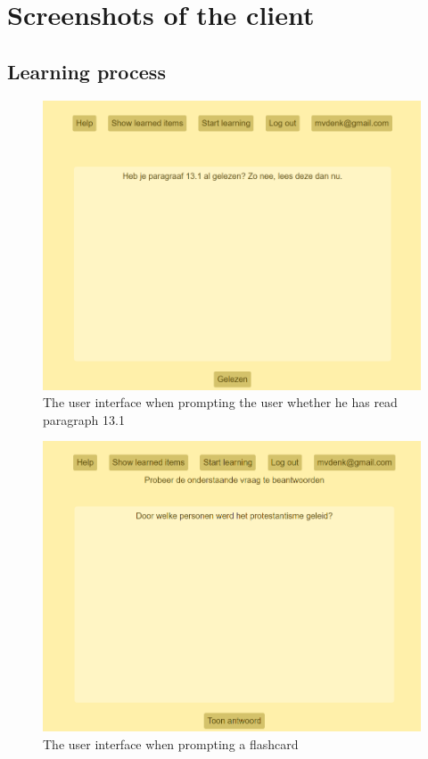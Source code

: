 \chapter{Screenshots of the client}
\label{app:clientscreenshots}

\section{Learning process}

\begin{figure}
    \centering
    \includegraphics[width=.8\textwidth]{img/ui_read_request.png}
    \caption{The user interface when prompting the user whether he has read paragraph 13.1}
    \label{fig:ui_read_request}
\end{figure}

\begin{figure}
    \centering
    \includegraphics[width=.8\textwidth]{img/ui_fc_prompt.png}
    \caption{The user interface when prompting a flashcard}
    \label{fig:ui_fc_prompt}
\end{figure}

